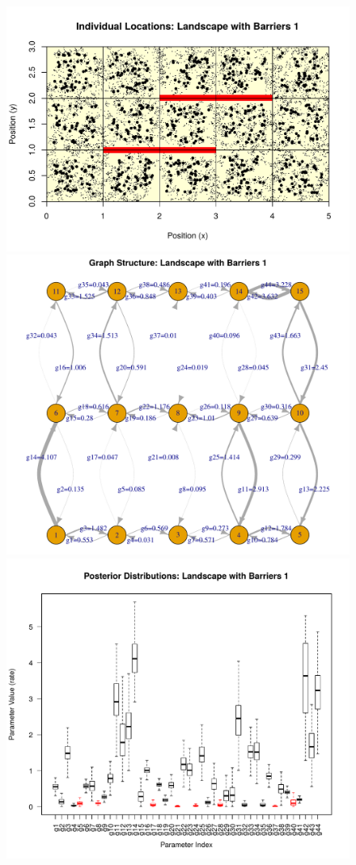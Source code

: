 \documentclass{article}
\begin{document}
\begin{figure}
\centering
     \includegraphics[scale=.8]{figs/ind_locs_5x3b_1}
     \includegraphics[height=0.3\textheight]{figs/grid_5x3b_1}
     \includegraphics[height=0.3\textheight]{figs/post_dists_5x3b_1_new}

\end{figure}
\end{document}
